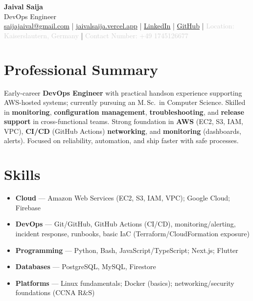 \documentclass[11pt,a4paper]{article}
\begin{document}
\frenchspacing
{}
\setlength{\emergencystretch}{6em}
\sloppy

\begin{center}
\begin{minipage}{0.92\textwidth}
\centering
    {\Huge\bfseries Jaival Saija}\\[0.5pt]
    {\large DevOps Engineer}\\[2pt]
    {\small
    \href{mailto:saijajaival@gmail.com}{saijajaival@gmail.com} \quad | \quad
    \href{https://jaivalsaija.vercel.app}{jaivalsaija.vercel.app} \quad | \quad
    \href{https://linkedin.com/in/jaivalsaija}{LinkedIn} \quad | \quad
    \href{https://github.com/Jaival}{GitHub} \quad | \quad
    \textcolor{lightgray}{Location: Kaiserslautern, Germany} \quad | \quad
    \textcolor{lightgray}{Contact Number: +49 1745126677}
    }
\end{minipage}
\end{center}

\vspace{4pt}

\section*{Professional Summary}
{\normalsize 
    Early-career \textbf{DevOps Engineer} with practical hands\textendash{}on experience supporting AWS-hosted systems; currently pursuing an M.\,Sc.\ in Computer Science. Skilled in \textbf{monitoring}, \textbf{configuration management}, \textbf{troubleshooting}, and \textbf{release support} in cross-functional teams. Strong foundation in \textbf{AWS} (EC2, S3, IAM, VPC), \textbf{CI/CD} (GitHub Actions) \textbf{networking}, and \textbf{monitoring} (dashboards, alerts). Focused on reliability, automation, and ship faster with safe processes.
}

\section*{Skills}
{\normalsize
\begin{itemize}
    \item \textbf{Cloud} — Amazon Web Services (EC2, S3, IAM, VPC); Google Cloud; Firebase
    \item \textbf{DevOps} — Git/GitHub, GitHub Actions (CI/CD), monitoring/alerting, incident response, runbooks, basic IaC (Ter\-raform/CloudFormation exposure)
    \item \textbf{Programming} — Python, Bash, JavaScript/TypeScript; Next.js; Flutter
    \item \textbf{Databases} — PostgreSQL, MySQL, Firestore
    \item \textbf{Platforms} — Linux fundamentals; Docker (basics); networking/security foundations (CCNA R\&S)
\end{itemize}}
\end{document}
